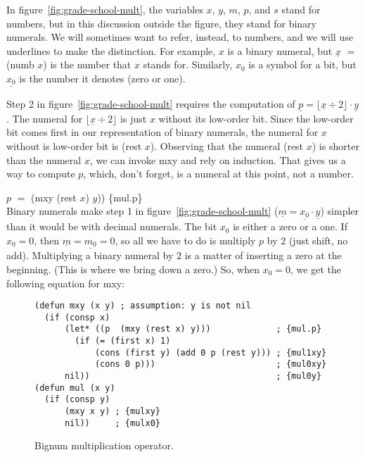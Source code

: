 In figure~\ref{fig:grade-school-mult}, the variables $x$, $y$, $m$, $p$, and $s$
stand for numbers, but in this discussion outside the figure,
they stand for binary numerals.
We will sometimes want to refer, instead, to numbers,
and we will use underlines to make the distinction.
For example, $x$ is a binary numeral,
but $\underline{x}$ $=$ \textsf{(numb $x$)}
is the number that $x$ stands for.
Similarly, $x_0$ is a symbol for a bit,
but $\underline{x_0}$ is the number it denotes (zero or one).

Step 2 in figure~\ref{fig:grade-school-mult} requires the computation of
$\underline{p} = \lfloor \underline{x} \div 2 \rfloor \cdot \underline{y}$.
The numeral for $\lfloor \underline{x} \div 2 \rfloor$ is just $x$ without its
low-order bit. Since the low-order bit comes first
in our representation of binary numerals,
the numeral for $x$ without is low-order bit is \textsf{(rest $x$)}.
Observing that the numeral \textsf{(rest $x$)}
is shorter than the numeral $x$,
we can invoke \textsf{mxy} and rely on induction.
That gives us a way to compute $p$, which, don't forget,
is a numeral at this point, not a number.

\vspace{2mm}\hspace*{2cm} $p$ $=$ \textsf{(mxy (rest $x$) $y$))} \hfill \{mul.p\}\\

Binary numerals make step 1 in figure~\ref{fig:grade-school-mult}
($\underline{m} = \underline{x_0} \cdot \underline{y}$)
simpler than it would be with decimal numerals.
The bit $x_0$ is either a zero or a one.
If $x_0 = 0$, then $\underline{m} = \underline{m_0} = 0$, so all
we have to do is multiply $p$ by $2$ (just shift, no add).
Multiplying a binary numeral by $2$ is a matter
of inserting a zero at the beginning.
(This is where we bring down a zero.)
So, when $x_0 = 0$, we get the following equation for \textsf{mxy}:

\begin{figure}
\begin{code}
\begin{verbatim}
(defun mxy (x y) ; assumption: y is not nil
  (if (consp x)
      (let* ((p  (mxy (rest x) y)))             ; {mul.p}
        (if (= (first x) 1)
            (cons (first y) (add 0 p (rest y))) ; {mul1xy}
            (cons 0 p)))                        ; {mul0xy}
      nil))                                     ; {mul0y}
(defun mul (x y)
  (if (consp y)
      (mxy x y) ; {mulxy}
      nil))     ; {mulx0}
\end{verbatim}
\end{code}
\label{bignum-mul-defun}
\caption{Bignum multiplication operator.}
\label{fig:bignum-mul-defun}
\end{figure}

